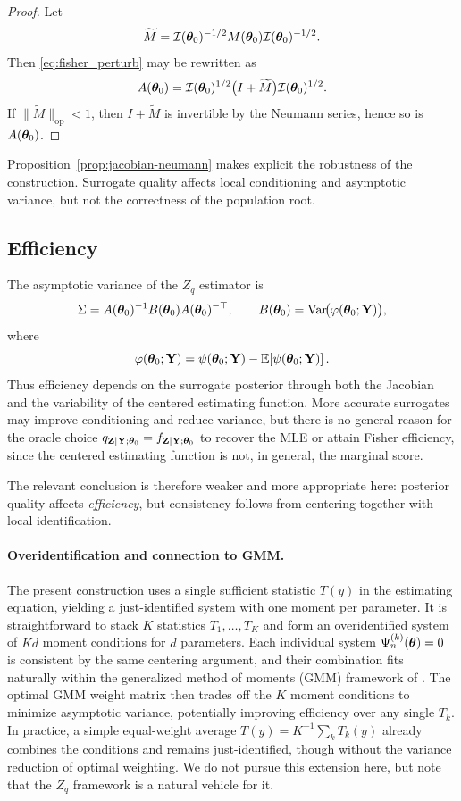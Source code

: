 \documentclass[twoside,11pt]{article}
\newcommand{\Var}{\operatorname{Var}}
\begin{document}
\begin{proof}
Let
\[
\widetilde M
=
\mathcal I({\bm{\theta}}_0)^{-1/2}
M({\bm{\theta}}_0)
\mathcal I({\bm{\theta}}_0)^{-1/2}.
\]
Then \eqref{eq:fisher_perturb} may be rewritten as
\[
A({\bm{\theta}}_0)
=
\mathcal I({\bm{\theta}}_0)^{1/2}
\bigl(I+\widetilde M\bigr)
\mathcal I({\bm{\theta}}_0)^{1/2}.
\]
If $\|\widetilde M\|_{\mathrm{op}}<1$, then $I+\widetilde M$ is invertible by
the Neumann series, hence so is $A({\bm{\theta}}_0)$.
\end{proof}

Proposition~\ref{prop:jacobian-neumann} makes explicit the robustness of the
construction. Surrogate quality affects local conditioning and asymptotic
variance, but not the correctness of the population root.

\subsection{Efficiency}

The asymptotic variance of the $Z_q$ estimator is
\[
\Sigma
=
A(\bt_0)^{-1}
B(\bt_0)
A(\bt_0)^{-\top},
\qquad
B(\bt_0)
=
\Var\!\bigl(\varphi(\bt_0;\Y)\bigr),
\]
where
\[
\varphi({\bm{\theta}}_0;{\bf Y})
=
\psi({\bm{\theta}}_0;{\bf Y})-\mathbb E\!\left[\psi({\bm{\theta}}_0;{\bf Y})\right].
\]
Thus efficiency depends on the surrogate posterior through both the Jacobian
and the variability of the centered estimating function. More accurate
surrogates may improve conditioning and reduce variance, but there is no
general reason for the oracle choice
$q_{{\bf Z}\mid{\bf Y};{\bm{\theta}}_0}=f_{{\bf Z}\mid{\bf Y};{\bm{\theta}}_0}$ to recover the MLE or attain Fisher
efficiency, since the centered estimating function is not, in general, the
marginal score.

The relevant conclusion is therefore weaker and more appropriate here:
posterior quality affects \emph{efficiency}, but consistency follows from
centering together with local identification.

\paragraph{Overidentification and connection to GMM.}
The present construction uses a single sufficient statistic $T(y)$ in the estimating equation, yielding a just-identified system with one moment per parameter.
It is straightforward to stack $K$ statistics $T_1,\ldots,T_K$ and form an overidentified system of $Kd$ moment conditions for $d$ parameters.
Each individual system $\Psi_n^{(k)}({\bm{\theta}})=0$ is consistent by the same centering argument, and their combination fits naturally within the generalized method of moments (GMM) framework of \citet{hansen1982large}.
The optimal GMM weight matrix then trades off the $K$ moment conditions to minimize asymptotic variance, potentially improving efficiency over any single $T_k$.
In practice, a simple equal-weight average $T(y) = K^{-1}\sum_k T_k(y)$ already combines the conditions and remains just-identified, though without the variance reduction of optimal weighting.
We do not pursue this extension here, but note that the $Z_q$ framework is a natural vehicle for it.
\end{document}
